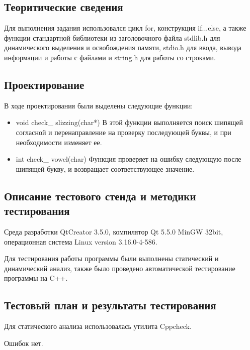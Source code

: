\documentclass[12pt,a4paper]{report}
\begin{document}
\subsection{Теоритические сведения}

Для выполнения задания использовался цикл for, конструкция if...else, а также функции стандартной библиотеки из заголовочного файла stdlib.h для динамического выделения и освобождения памяти, stdio.h для ввода, вывода информации и работы с файлами и string.h для работы со строками. 

\subsection{Проектирование}

В ходе проектирования были выделены следующие функции:

\begin{itemize}
	 \item void check\_ slizzing(char*)
 	В этой функции выполняется поиск шипящей согласной и перенаправление на проверку последующей буквы, и при необходимости изменяет ее.
 	
 	\item int check\_ vowel(char)
 	Функция проверяет на ошибку следующую после шипящей букву, и возвращает соответствующее значение.
\end{itemize}
	
	
\subsection{Описание тестового стенда и методики тестирования}
Среда разработки QtCreator 3.5.0, компилятор Qt 5.5.0 MinGW 32bit, операционная система Linux version 3.16.0-4-586.

Для тестирования работы программы были выполнены статический и динамический анализ, также было проведено автоматической тестирование программы на C++.
\subsection{Тестовый план и результаты тестирования}

Для статического анализа использовалась утилита Cppcheck.

\vspace{\baselineskip}

Ошибок нет.

\vspace{\baselineskip}
\end{document}
